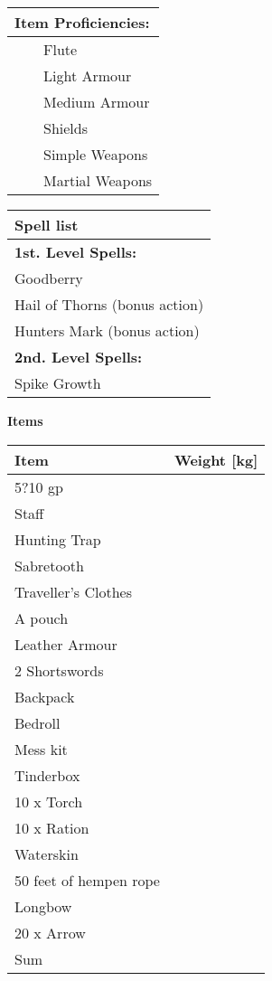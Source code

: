 \documentclass[11pt]{article}
\newcommand{\tabitem}{~~\llap{--}~~}
\begin{document}
\begin{multicols}{2}
\vspace{4mm}

\noindent \begin{tabularx}{\linewidth}{@{}l}
{\Large \textbf{Item Proficiencies:}} \\
\hline
\tabitem Flute \\
\tabitem Light Armour \\
\tabitem Medium Armour \\
\tabitem Shields \\
\tabitem Simple Weapons \\
\tabitem Martial Weapons
		\end{tabularx}

\vspace{4mm}

\noindent \begin{tabularx}{\linewidth}{@{}l}
{\Large \textbf{Spell list}} 		\\
\hline
\textbf{1st. Level Spells:}			\\
Goodberry							\\		
Hail of Thorns (bonus action)		\\
Hunters Mark (bonus action)			\\

\textbf{2nd. Level Spells:}			\\
Spike Growth
		\end{tabularx}
	\end{multicols}

\clearpage

	\begin{center}
{\LARGE \textbf{Items}}
	\end{center}

	\begin{tabularx}{\textwidth}{X|r}
Item & Weight [kg] \\
\hline
5?10 gp					 					& 			\\
Staff	 		 							& 			\\
Hunting Trap	 		 					& 			\\
Sabretooth 		 							& 			\\
Traveller's Clothes	 						& 			\\
A pouch	 		 							& 			\\
Leather Armour	 							& 			\\
2 Shortswords	 							& 			\\
Backpack		 							& 			\\
Bedroll			 							& 			\\
Mess kit		 							& 			\\
Tinderbox		 							& 			\\
10 x Torch	 								& 			\\
10 x Ration		 							& 			\\
Waterskin		 							& 			\\
50 feet of hempen rope						& 			\\
Longbow			 							& 			\\
20 x Arrow		 							& 			\\
\hline
Sum 										& 
	\end{tabularx}
\end{document}
